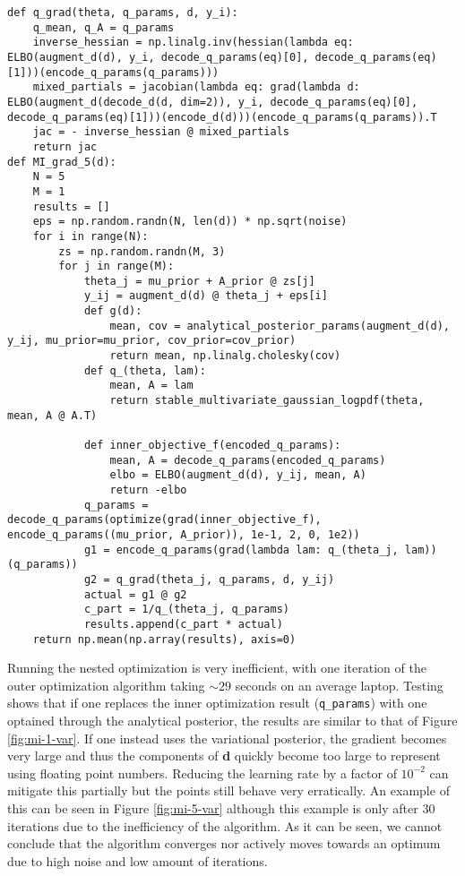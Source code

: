 \begin{verbatim}
def q_grad(theta, q_params, d, y_i):
    q_mean, q_A = q_params
    inverse_hessian = np.linalg.inv(hessian(lambda eq: ELBO(augment_d(d), y_i, decode_q_params(eq)[0], decode_q_params(eq)[1]))(encode_q_params(q_params)))
    mixed_partials = jacobian(lambda eq: grad(lambda d: ELBO(augment_d(decode_d(d, dim=2)), y_i, decode_q_params(eq)[0], decode_q_params(eq)[1]))(encode_d(d)))(encode_q_params(q_params)).T
    jac = - inverse_hessian @ mixed_partials
    return jac
def MI_grad_5(d):
    N = 5
    M = 1
    results = []
    eps = np.random.randn(N, len(d)) * np.sqrt(noise)
    for i in range(N):
        zs = np.random.randn(M, 3)
        for j in range(M):
            theta_j = mu_prior + A_prior @ zs[j]
            y_ij = augment_d(d) @ theta_j + eps[i]
            def g(d):
                mean, cov = analytical_posterior_params(augment_d(d), y_ij, mu_prior=mu_prior, cov_prior=cov_prior)
                return mean, np.linalg.cholesky(cov)
            def q_(theta, lam):
                mean, A = lam
                return stable_multivariate_gaussian_logpdf(theta, mean, A @ A.T)
            
            def inner_objective_f(encoded_q_params):
                mean, A = decode_q_params(encoded_q_params)
                elbo = ELBO(augment_d(d), y_ij, mean, A)
                return -elbo
            q_params = decode_q_params(optimize(grad(inner_objective_f), encode_q_params((mu_prior, A_prior)), 1e-1, 2, 0, 1e2))
            g1 = encode_q_params(grad(lambda lam: q_(theta_j, lam))(q_params))
            g2 = q_grad(theta_j, q_params, d, y_ij)
            actual = g1 @ g2
            c_part = 1/q_(theta_j, q_params)
            results.append(c_part * actual)
    return np.mean(np.array(results), axis=0)
\end{verbatim}
Running the nested optimization is very inefficient, with one iteration of the outer optimization algorithm taking $\sim 29$ seconds on an average laptop.
Testing shows that if one replaces the inner optimization result (\texttt{q\_params}) with one optained through the analytical posterior, the results are similar to that of Figure \ref{fig:mi-1-var}.
If one instead uses the variational posterior, the gradient becomes very large and thus the components of \textbf{d} quickly become too large to represent using floating point numbers. 
Reducing the learning rate by a factor of $10^{-2}$ can mitigate this partially
but the points still behave very erratically. An example of this can be seen in Figure \ref{fig:mi-5-var} although this example is only after 30 iterations due to the inefficiency of the algorithm.
As it can be seen, we cannot conclude that the algorithm converges nor actively moves towards an optimum due to high noise and low amount of iterations.

